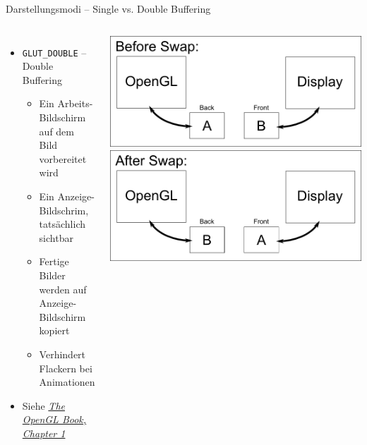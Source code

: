 \begin{frame}{Darstellungsmodi -- Single vs. Double Buffering}
%
\begin{columns}[T]
\begin{itemize}
\item \texttt{GLUT\_DOUBLE} -- Double Buffering
	\begin{itemize}
	\item Ein Arbeits-Bildschirm auf dem Bild vorbereitet wird
	\item Ein Anzeige-Bildschrim, tatsächlich sichtbar
	\item Fertige Bilder werden auf Anzeige-Bildschirm kopiert
	\item Verhindert Flackern bei Animationen
	\end{itemize}
\item Siehe \href{http://openglbook.com/chapter-1-getting-started.html}{\emph{The OpenGL Book, Chapter 1}}
\end{itemize}
%
\includegraphics[width=\linewidth]{./gfx/GL-DoubleBuffer-1}\newline
\includegraphics[width=\linewidth]{./gfx/GL-DoubleBuffer-2}
\end{columns}
%
\end{frame}


